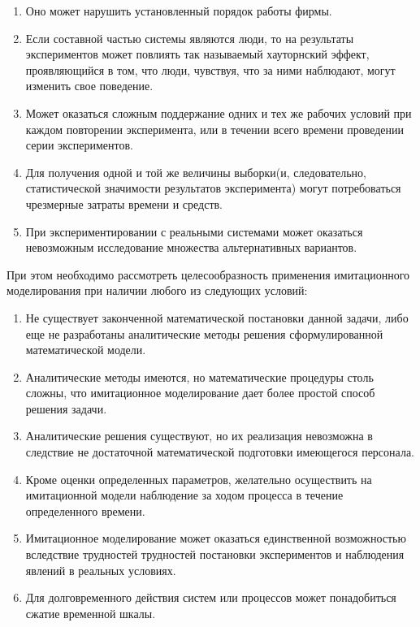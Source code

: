 \begin{enumerate}
    \item Оно может нарушить установленный порядок работы фирмы.
    \item Если составной частью системы являются люди, то на результаты экспериментов может повлиять так называемый хауторнский эффект, проявляющийся в том, что люди, чувствуя, что за ними наблюдают, могут изменить свое поведение.
    \item Может оказаться сложным поддержание одних и тех же рабочих условий при каждом повторении эксперимента, или в течении всего времени проведении серии экспериментов.
    \item Для получения одной и той же величины выборки(и, следовательно, статистической значимости результатов эксперимента) могут потребоваться чрезмерные затраты времени и средств.
    \item При экспериментировании с реальными системами может оказаться невозможным исследование множества альтернативных вариантов.
\end{enumerate}

    При этом необходимо рассмотреть целесообразность применения имитационного моделирования при наличии любого из следующих условий:

\begin{enumerate}
    \item Не существует законченной математической постановки данной задачи, либо еще не разработаны аналитические методы решения сформулированной математической модели.
    \item Аналитические методы имеются, но математические процедуры столь сложны, что имитационное моделирование дает более простой способ решения задачи.
    \item Аналитические решения существуют, но их реализация невозможна в следствие не достаточной математической подготовки имеющегося персонала.
    \item Кроме оценки определенных параметров, желательно осуществить на имитационной модели наблюдение за ходом процесса в течение определенного времени.
    \item Имитационное моделирование может оказаться единственной возможностью вследствие трудностей трудностей постановки экспериментов и наблюдения явлений в реальных условиях.
    \item Для долговременного действия систем или процессов может понадобиться сжатие временной шкалы.
\end{enumerate}

